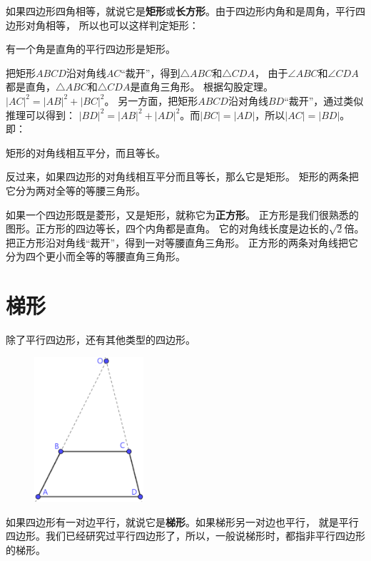 \documentclass[12pt,UTF8]{ctexbook}
\begin{document}
如果四边形四角相等，就说它是\textbf{矩形}或\textbf{长方形}。由于四边形内角和是周角，平行四边形对角相等，
所以也可以这样判定矩形：
\begin{tm}\label{tm:0-1-10}
    有一个角是直角的平行四边形是矩形。
\end{tm}

把矩形$ABCD$沿对角线$AC$“裁开”，得到$\triangle ABC$和$\triangle CDA$，
由于$\angle ABC$和$\angle CDA$都是直角，$\triangle ABC$和$\triangle CDA$是直角三角形。
根据勾股定理。$|AC|^2 = |AB|^2 + |BC|^2$。
另一方面，把矩形$ABCD$沿对角线$BD$“裁开”，通过类似推理可以得到：
$|BD|^2 = |AB|^2 + |AD|^2$。而$|BC| = |AD|$，所以$|AC| = |BD|$。即：
\begin{tm}\label{tm:0-1-15}
    矩形的对角线相互平分，而且等长。
\end{tm}

反过来，如果四边形的对角线相互平分而且等长，那么它是矩形。
矩形的两条把它分为两对全等的等腰三角形。

如果一个四边形既是菱形，又是矩形，就称它为\textbf{正方形}。
正方形是我们很熟悉的图形。正方形的四边等长，四个内角都是直角。
它的对角线长度是边长的$\sqrt{2}$倍。把正方形沿对角线“裁开”，得到一对等腰直角三角形。
正方形的两条对角线把它分为四个更小而全等的等腰直角三角形。

\section{梯形}
除了平行四边形，还有其他类型的四边形。

\begin{figure} %
    \vspace{-35pt}
    \centering
    \includegraphics[width=0.36\textwidth]{tu/梯形1.png}
\end{figure}

如果四边形有一对边平行，就说它是\textbf{梯形}。如果梯形另一对边也平行，
就是平行四边形。我们已经研究过平行四边形了，所以，一般说梯形时，都指非平行四边形的梯形。
\end{document}
